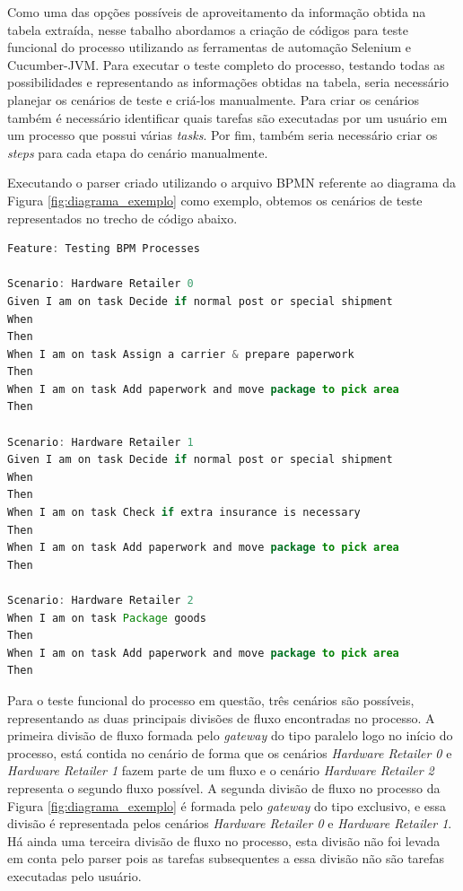\documentclass[12pt]{article}
\begin{document}
Como uma das opções possíveis de aproveitamento da informação obtida na tabela extraída, nesse tabalho abordamos a criação de códigos para teste funcional do processo utilizando as ferramentas de automação Selenium e Cucumber-JVM. Para executar o teste completo do processo, testando todas as possibilidades e representando as informações obtidas na tabela, seria necessário planejar os cenários de teste e criá-los manualmente. Para criar os cenários também é necessário identificar quais tarefas são executadas por um usuário em um processo que possui várias \emph{tasks}. Por fim, também seria necessário criar os \emph{steps} para cada etapa do cenário manualmente.
 


Executando o parser criado utilizando o arquivo BPMN referente ao diagrama da Figura \ref{fig:diagrama_exemplo} como exemplo, obtemos os cenários de teste representados no trecho de código abaixo. 


\begin{lstlisting}[language=Java]
Feature: Testing BPM Processes  
 
Scenario: Hardware Retailer 0 
Given I am on task Decide if normal post or special shipment 
When 
Then 
When I am on task Assign a carrier & prepare paperwork 
Then 
When I am on task Add paperwork and move package to pick area 
Then 
 
Scenario: Hardware Retailer 1 
Given I am on task Decide if normal post or special shipment 
When 
Then 
When I am on task Check if extra insurance is necessary 
Then 
When I am on task Add paperwork and move package to pick area 
Then 
 
Scenario: Hardware Retailer 2
When I am on task Package goods 
Then 
When I am on task Add paperwork and move package to pick area 
Then 

\end{lstlisting}

Para o teste funcional do processo em questão, três cenários são possíveis, representando as duas principais divisões de fluxo encontradas no processo. A primeira divisão de fluxo formada pelo \emph{gateway} do tipo paralelo logo no início do processo, está contida no cenário de forma que os cenários \emph{Hardware Retailer 0} e \emph{Hardware Retailer 1} fazem parte de um fluxo e o cenário \emph{Hardware Retailer 2} representa o segundo fluxo possível. A segunda divisão de fluxo no processo da Figura \ref{fig:diagrama_exemplo} é formada pelo \emph{gateway} do tipo exclusivo, e essa divisão é representada pelos cenários \emph{Hardware Retailer 0} e \emph{Hardware Retailer 1}. Há ainda uma terceira divisão de fluxo no processo, esta divisão não foi levada em conta pelo parser pois as tarefas subsequentes a essa divisão não são tarefas executadas pelo usuário.
\end{document}
